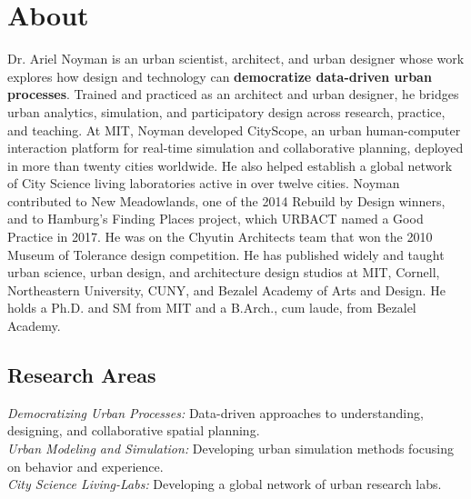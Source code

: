 \section*{About}

{
    Dr. Ariel Noyman is an urban scientist, architect, and urban designer whose work explores how design and technology can \textbf{democratize data-driven urban processes}. Trained and practiced as an architect and urban designer, he bridges urban analytics, simulation, and participatory design across research, practice, and teaching. At MIT, Noyman developed CityScope, an urban human-computer interaction platform for real-time simulation and collaborative planning, deployed in more than twenty cities worldwide. He also helped establish a global network of City Science living laboratories active in over twelve cities. Noyman contributed to New Meadowlands, one of the 2014 Rebuild by Design winners, and to Hamburg's Finding Places project, which URBACT named a Good Practice in 2017. He was on the Chyutin Architects team that won the 2010 Museum of Tolerance design competition. He has published widely and taught urban science, urban design, and architecture design studios at MIT, Cornell, Northeastern University, CUNY, and Bezalel Academy of Arts and Design. He holds a Ph.D. and SM from MIT and a B.Arch., cum laude, from Bezalel Academy.
}

\subsection*{Research Areas}
\textit{Democratizing Urban Processes:} Data-driven approaches to understanding, designing, and collaborative spatial planning.
\\
\textit{Urban Modeling and Simulation:} Developing urban simulation methods focusing on behavior and experience.
\\
\textit{City Science Living-Labs:} Developing a global network of urban research labs.
